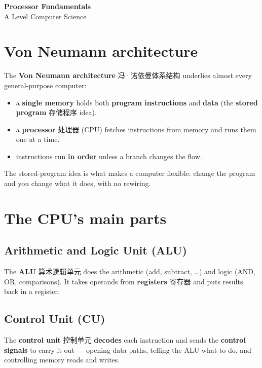 \documentclass[11pt]{article}
\begin{document}
\begin{center}
  {\LARGE\bfseries Processor Fundamentals}\\[0.35em]
  {\large A Level Computer Science}
\end{center}
\vspace{0.6em}

\section*{Von Neumann architecture}

The \textbf{Von Neumann architecture} 冯·诺依曼体系结构 underlies almost every general-purpose computer:

\begin{itemize}
\item a \textbf{single memory} holds both \textbf{program instructions} and \textbf{data} (the \textbf{stored program} 存储程序 idea).

\item a \textbf{processor} 处理器 (CPU) fetches instructions from memory and runs them one at a time.

\item instructions run \textbf{in order} unless a branch changes the flow.

\end{itemize}

The stored-program idea is what makes a computer flexible: change the program and you change what it does, with no rewiring.

\section*{The CPU's main parts}

\subsection*{Arithmetic and Logic Unit (ALU)}

The \textbf{ALU} 算术逻辑单元 does the arithmetic (add, subtract, …) and logic (AND, OR, comparisons). It takes operands from \textbf{registers} 寄存器 and puts results back in a register.

\subsection*{Control Unit (CU)}

The \textbf{control unit} 控制单元 \textbf{decodes} each instruction and sends the \textbf{control signals} to carry it out — opening data paths, telling the ALU what to do, and controlling memory reads and writes.
\end{document}
